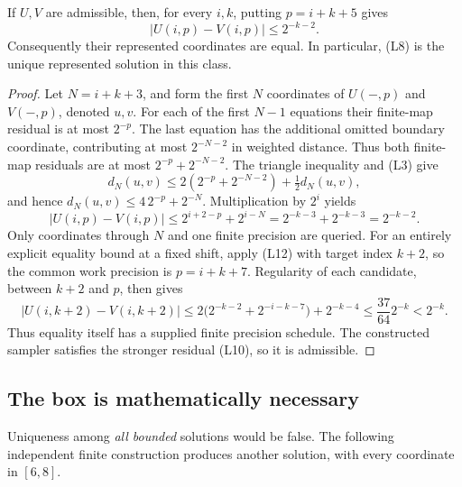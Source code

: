 \begin{theorem}
\label{thm:lattice-unique}
If \(U,V\) are admissible, then, for every \(i,k\), putting
\(p=i+k+5\) gives
\[
 |U(i,p)-V(i,p)|\le2^{-k-2}.                    \tag{L12}
\]
Consequently their represented coordinates are equal. In particular,
(L8) is the unique represented solution in this class.
\end{theorem}
\begin{proof}
Let \(N=i+k+3\), and form the first \(N\) coordinates of
\(U(-,p)\) and \(V(-,p)\), denoted \(u,v\). For each of the
first \(N-1\) equations their finite-map residual is at most
\(2^{-p}\). The last equation has the additional omitted boundary
coordinate, contributing at most \(2^{-N-2}\) in weighted distance.
Thus both finite-map residuals are at most
\(2^{-p}+2^{-N-2}\). The triangle inequality and (L3) give
\[
 d_N(u,v)\le2(2^{-p}+2^{-N-2})+\tfrac12d_N(u,v),
\]
and hence \(d_N(u,v)\le4\,2^{-p}+2^{-N}\). Multiplication by
\(2^i\) yields
\[
 |U(i,p)-V(i,p)|
 \le2^{i+2-p}+2^{i-N}
 =2^{-k-3}+2^{-k-3}=2^{-k-2}.
\]
Only coordinates through \(N\) and one finite precision are queried.
For an entirely explicit equality bound at a fixed shift, apply
(L12) with target index \(k+2\), so the common work precision is
\(p=i+k+7\). Regularity of each candidate, between \(k+2\)
and \(p\), then gives
\[
 |U(i,k+2)-V(i,k+2)|
 \le 2\bigl(2^{-k-2}+2^{-i-k-7}\bigr)+2^{-k-4}
 \le\frac{37}{64}2^{-k}<2^{-k}.
\]
Thus equality itself has a supplied finite precision schedule. The
constructed sampler satisfies the stronger residual (L10), so it is
admissible.
\end{proof}

\subsection{The box is mathematically necessary}

Uniqueness among \emph{all bounded} solutions would be false. The
following independent finite construction produces another solution,
with every coordinate in \([6,8]\).

